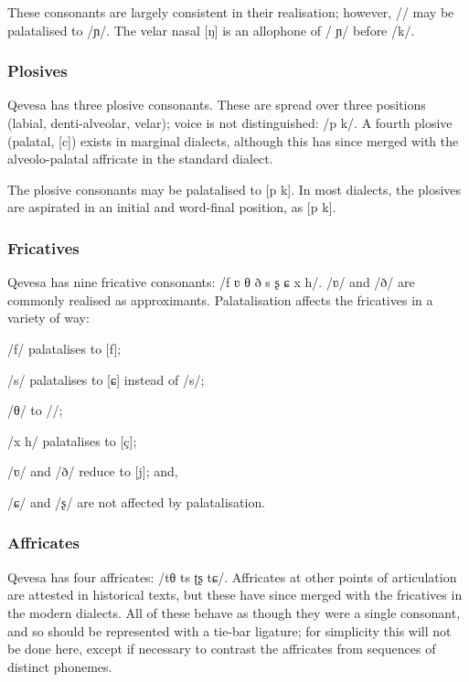 \documentclass[grammar]{subfiles}
\begin{document}
  These consonants are largely consistent in their realisation; however, // may be palatalised to /ɲ/. The velar nasal [ŋ] is an allophone of / ɲ/ before /k/.

  \subsubsection{Plosives}
  \label{sssec:plosives}

  Qevesa has three plosive consonants. These are spread over three positions (labial, denti-alveolar, velar); voice is not distinguished: /p  k/. A fourth plosive (palatal, [c]) exists in marginal dialects, although this has since merged with the alveolo-palatal affricate in the standard dialect.

  The plosive consonants may be palatalised to [p\superj{}  k\superj]. In most dialects, the plosives are aspirated in an initial and word-final position, as [p\superh{}  k\superh].

  \subsubsection{Fricatives}
  \label{sssec:fricatives}

  Qevesa has nine fricative consonants: /f ʋ θ ð s ʂ ɕ x h/. /ʋ/ and /ð/ are commonly realised as approximants. Palatalisation affects the fricatives in a variety of way: 

  \begin{itemize*}
  \item /f/ palatalises to [f\superj{}];
  \item /s/ palatalises to [ɕ] instead of /s\superj/;
  \item /θ/ to //;
  \item /x h/ palatalises to [ç];
  \item /ʋ/ and /ð/ reduce to [j]; and,
  \item /ɕ/ and /ʂ/ are not affected by palatalisation.
  \end{itemize*}

  \subsubsection{Affricates}
  \label{sssec:affricates}

  Qevesa has four affricates: /tθ ts ʈʂ tɕ/. Affricates at other points of articulation are attested in historical texts, but these have since merged with the fricatives in the modern dialects. All of these behave as though they were a single consonant, and so should be represented with a tie-bar ligature; for simplicity this will not be done here, except if necessary to contrast the affricates from sequences of distinct phonemes. 
\end{document}
